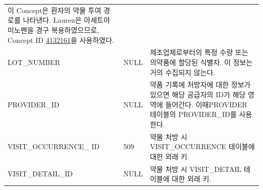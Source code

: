 \documentclass[11pt]{book}
\theoremstyle{definition}
\theoremstyle{definition}
\theoremstyle{definition}
\theoremstyle{remark}
\begin{document}
\begin{longtable}[]{@{}lll@{}}
\begin{minipage}[t]{0.48\columnwidth}
이 Concept은 환자의 약물 투여 경로를 나타낸다. Lauren은 아세트아미노펜을
경구 복용하였으므로, Concept ID
\href{http://athena.ohdsi.org/search-terms/terms/4132161}{4132161}을
사용하였다.\strut
\end{minipage}\tabularnewline
\begin{minipage}[t]{0.28\columnwidth}\raggedright\strut
LOT\_NUMBER\strut
\end{minipage} & \begin{minipage}[t]{0.16\columnwidth}\raggedright\strut
NULL\strut
\end{minipage} & \begin{minipage}[t]{0.48\columnwidth}\raggedright\strut
제조업체로부터의 특정 수량 또는 의약품에 할당된 식별자. 이 정보는 거의
수집되지 않는다.\strut
\end{minipage}\tabularnewline
\begin{minipage}[t]{0.28\columnwidth}\raggedright\strut
PROVIDER\_ID\strut
\end{minipage} & \begin{minipage}[t]{0.16\columnwidth}\raggedright\strut
NULL\strut
\end{minipage} & \begin{minipage}[t]{0.48\columnwidth}\raggedright\strut
약품 기록에 처방자에 대한 정보가 있으면 해당 공급자의 ID가 해당 영역에
들어간다. 이때PROVIDER 테이블의 PROVIDER\_ID를 사용한다.\strut
\end{minipage}\tabularnewline
\begin{minipage}[t]{0.28\columnwidth}\raggedright\strut
VISIT\_OCCURRENCE\_ ID\strut
\end{minipage} & \begin{minipage}[t]{0.16\columnwidth}\raggedright\strut
509\strut
\end{minipage} & \begin{minipage}[t]{0.48\columnwidth}\raggedright\strut
약물 처방 시 VISIT\_OCCURRENCE 테이블에 대한 외래 키.\strut
\end{minipage}\tabularnewline
\begin{minipage}[t]{0.28\columnwidth}\raggedright\strut
VISIT\_DETAIL\_ID\strut
\end{minipage} & \begin{minipage}[t]{0.16\columnwidth}\raggedright\strut
NULL\strut
\end{minipage} & \begin{minipage}[t]{0.48\columnwidth}\raggedright\strut
약물 처방 시 VISIT\_DETAIL 테이블에 대한 외래 키.\strut
\end{minipage}\tabularnewline

\end{longtable}
\end{document}

